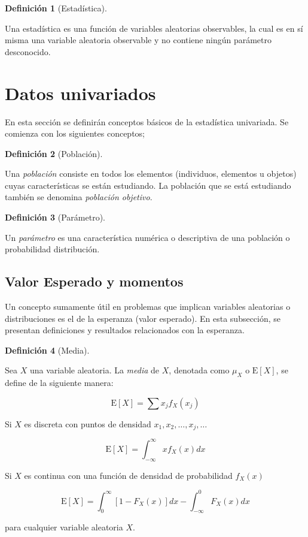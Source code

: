 \documentclass[
  us-letterpaper,
]{scrreprt}
\theoremstyle{plain}
\theoremstyle{definition}
\theoremstyle{plain}
\theoremstyle{definition}
\newtheorem{definition}{Definición}[chapter]
\theoremstyle{remark}
\begin{document}
\begin{definition}[Estadística]\protect\hypertarget{def-estad}{}\label{def-estad}

Una estadística es una función de variables aleatorias observables, la
cual es en sí misma una variable aleatoria observable y no contiene
ningún parámetro desconocido.

\end{definition}

\section{Datos univariados}\label{datos-univariados}

En esta sección se definirán conceptos básicos de la estadística
univariada. Se comienza con los siguientes conceptos;

\begin{definition}[Población]\protect\hypertarget{def-pobla}{}\label{def-pobla}

Una \emph{población} consiste en todos los elementos (individuos,
elementos u objetos) cuyas características se están estudiando. La
población que se está estudiando también se denomina \emph{población
objetivo}.

\end{definition}

\begin{definition}[Parámetro]\protect\hypertarget{def-param}{}\label{def-param}

Un \emph{parámetro} es una característica numérica o descriptiva de una
población o probabilidad distribución.

\end{definition}

\subsection{Valor Esperado y momentos}\label{valor-esperado-y-momentos}

Un concepto sumamente útil en problemas que implican variables
aleatorias o distribuciones es el de la esperanza (valor esperado). En
esta subsección, se presentan definiciones y resultados relacionados con
la esperanza.

\begin{definition}[Media]\protect\hypertarget{def-mean}{}\label{def-mean}

Sea \(X\) una variable aleatoria. La \emph{media} de \(X\), denotada
como \(\mu_X\) o \(\mathrm E[X]\), se define de la siguiente manera:

\[ \mathrm E[X]= \sum x_jf_X(x_j) \]

Si \(X\) es discreta con puntos de densidad
\(x_1, x_2, \ldots, x_j, \ldots\)

\[ \mathrm E[X]=\int_{-\infty}^\infty x f_X(x)dx \]

Si \(X\) es continua con una función de densidad de probabilidad
\(f_X(x)\)

\[ \mathrm E[X]=\int_0^\infty [1-F_X(x)]dx-\int_{-\infty}^0 F_X(x) dx \]

para cualquier variable aleatoria \(X\).

\end{definition}
\end{document}

